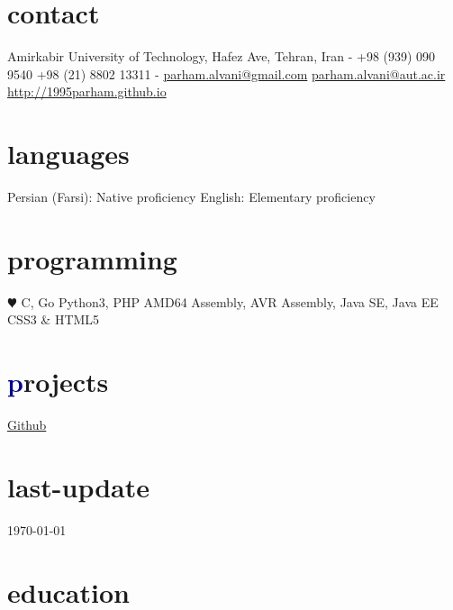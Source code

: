 \documentclass[]{friggeri-cv} %
\begin{document}


\begin{aside} %
\section{\textcolor{TextYellow}{c}ontact}
Amirkabir University of Technology,
Hafez Ave,
Tehran, Iran
-
+98 (939) 090 9540
+98 (21) 8802 13311
-
\href{mailto:parham.alvani@gmail.com}{parham.alvani@gmail.com}
\href{mailto:parham.alvani@aut.ac.ir}{parham.alvani@aut.ac.ir}
\href{http://1995parham.github.io/}{http://1995parham.github.io}
\section{\textcolor{TextOrange}{l}anguages}
Persian (Farsi):
Native proficiency
English:
Elementary proficiency
\section{\textcolor{TextGreen}{p}rogramming}
{\color{red} $\varheartsuit$} C, Go
Python3, PHP
AMD64 Assembly,
AVR Assembly,
Java SE, Java EE
CSS3 \& HTML5
\section{\textcolor{DarkBlue}{p}rojects}
\href{http://github.com/1995parham}{Github}
\section{\textcolor{Ocean}{last}-update}
\today
\end{aside}


\section{education}
\end{document}
